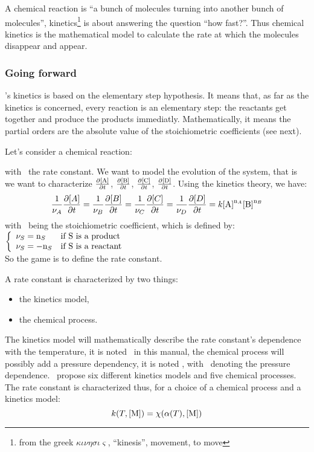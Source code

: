 A chemical reaction is ``a bunch of molecules
turning into another bunch of molecules'', kinetics\footnote{%
from the greek $\kappa\iota\nu\eta\sigma\iota\varsigma$, ``kinesis'', movement, to move}
is about answering the question ``how fast?''.
Thus chemical kinetics is the mathematical model
to calculate the rate at which the molecules disappear and
appear.

\subsubsection{Going forward}

\Antioch's kinetics is based on the elementary step
hypothesis. It means that, as far as the kinetics is
concerned, every reaction is an elementary step:
the reactants get together and produce the products
immediatly. Mathematically, it means
the partial orders are the absolute
value of the stoichiometric coefficients (see next).

Let's consider a chemical reaction:
\begin{chemicalEquation}
\label{genericX}
\end{chemicalEquation}
with \rcons\ the rate constant.
We want to model the evolution of the system, that is we want to
characterize 
$\doverdt{\conc[A]}$,
$\doverdt{\conc[B]}$,
$\doverdt{\conc[C]}$,
$\doverdt{\conc[D]}$.
Using the kinetics theory, we have:
\begin{equation}
\frac{1}{\scoef[A]}\doverdt{[A]} = 
\frac{1}{\scoef[B]}\doverdt{[B]} = 
\frac{1}{\scoef[C]}\doverdt{[C]} = 
\frac{1}{\scoef[D]}\doverdt{[D]} = 
\rcons\conc[A]^{\scoefabs[A]}\conc[B]^{\scoefabs[B]}
\end{equation}
with \scoef[A]\ being the stoichiometric coefficient, which is defined by:\\[5pt]
$\left\{\begin{array}{ll}
\scoef[S] = \scoefabs[S] & \text{if \ce{S} is a product} \\
\scoef[S] = -\scoefabs[S] & \text{if \ce{S} is a reactant} \\
\end{array}\right.$\\[5pt]
So the game is to define the rate constant. 

A rate constant is characterized by two things:
\begin{itemize}
\item the kinetics model,
\item the chemical process.
\end{itemize}
The kinetics model will mathematically describe the rate constant's dependence with
the temperature, it is noted \kinMod\ in this manual, the chemical process will
possibly add a pressure dependency, it is noted \chemProc, with \conc[M]\
denoting the pressure dependence.
\Antioch\ propose six different kinetics models and five chemical processes.
The rate constant is characterized thus, for a choice of a chemical process and
a kinetics model:
\begin{equation}
\rateCons = \chemProc
\end{equation}

